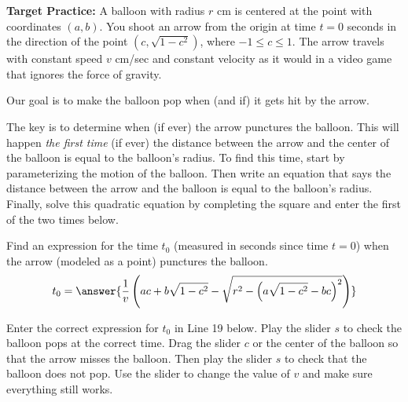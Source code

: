 \documentclass{ximera}
\begin{document}
\begin{example} {\bf Target Practice:}
A balloon with radius $r$ cm is centered at the point with coordinates $(a,b)$. You shoot an arrow from the origin at time $t=0$ seconds in the direction of the point $(c, \sqrt{1-c^2})$, where $-1\leq c \leq 1$. The arrow travels with constant speed $v$ cm/sec and constant velocity as it would in a video game that ignores the force of gravity. 

Our goal is to make the balloon pop when (and if) it gets hit by the arrow. 
\end{example}

\begin{explanation}
The key is to determine when (if ever) the arrow punctures the balloon. This will happen \emph{the first time} (if ever) the distance between the arrow and the center of the balloon is equal to the balloon's radius. To find this time, start by parameterizing the motion of the balloon. Then write an equation that says the distance between the arrow and the balloon is equal to the balloon's radius. Finally, solve this quadratic equation by completing the square and enter the first of the two times below. 

\begin{question}

Find an expression for the time $t_0$ (measured in seconds since time $t=0$) when the arrow (modeled as a point) punctures the balloon. 
\[
   t_0 = \answer{\frac{1}{v} \left( a c + b \sqrt{1-c^2}-\sqrt{r^2 - \left( a \sqrt{1-c^2} - b c \right)^2}\right)}
\]

\end{question}

\begin{exploration}\label{exp:pc1c}
Enter the correct expression for $t_0$ in Line 19 below. Play the slider $s$ to check the balloon pops at the correct time. Drag the slider $c$ or the center of the balloon so that the arrow misses the balloon. Then play the slider $s$ to check that the balloon does not pop. Use the slider to change the value of $v$ and make sure everything still works.

 
\begin{onlineOnly}
    \begin{center}
\end{center}
\end{onlineOnly}
\end{exploration}


\end{explanation}
\end{document}

